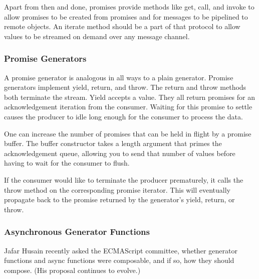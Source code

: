 
Apart from then and done, promises provide methods like get, call, and invoke to allow promises to be created from promises and for messages to be pipelined to remote objects. An iterate method should be a part of that protocol to allow values to be streamed on demand over any message channel.

\subsubsection{Promise Generators}

A promise generator is analogous in all ways to a plain generator. Promise generators implement yield, return, and throw. The return and throw methods both terminate the stream. Yield accepts a value. They all return promises for an acknowledgement iteration from the consumer. Waiting for this promise to settle causes the producer to idle long enough for the consumer to process the data.

One can increase the number of promises that can be held in flight by a promise buffer. The buffer constructor takes a length argument that primes the acknowledgement queue, allowing you to send that number of values before having to wait for the consumer to flush.

If the consumer would like to terminate the producer prematurely, it calls the throw method on the corresponding promise iterator. This will eventually propagate back to the promise returned by the generator’s yield, return, or throw.


\subsubsection{Asynchronous Generator Functions}

Jafar Husain recently asked the ECMAScript committee, whether generator functions and async functions were composable, and if so, how they should compose. (His proposal continues to evolve.)

